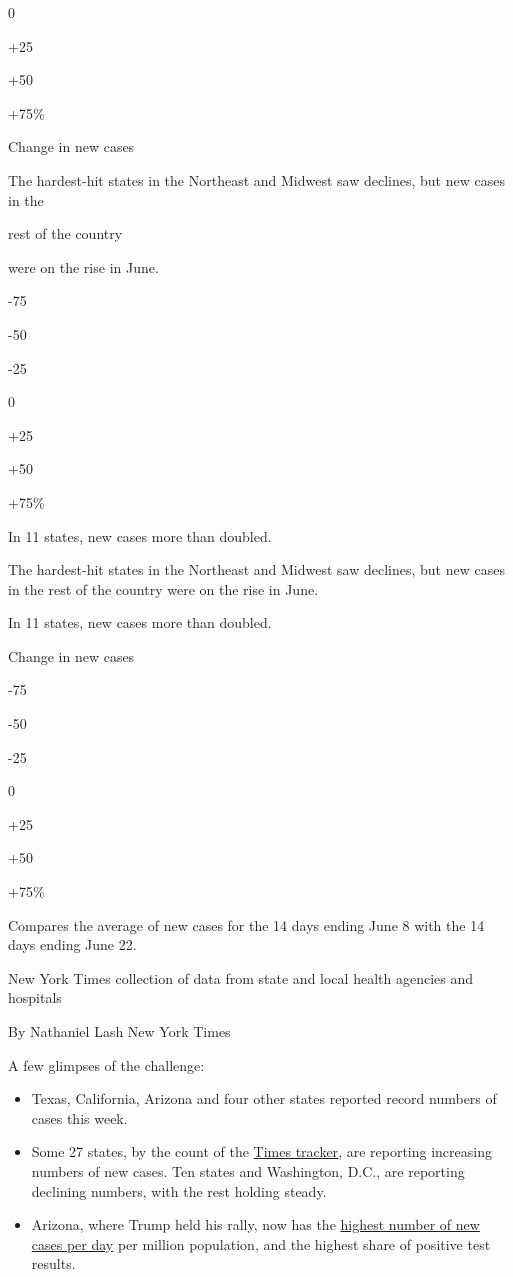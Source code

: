 0

+25

+50

+75\%

Change in new cases

The hardest-hit states in the Northeast and Midwest saw declines, but
new cases in the

rest of the country

were on the rise in June.

-75

-50

-25

0

+25

+50

+75\%

In 11 states, new cases more than doubled.

The hardest-hit states in the Northeast and Midwest saw declines, but
new cases in the rest of the country were on the rise in June.

In 11 states, new cases more than doubled.

Change in new cases

-75

-50

-25

0

+25

+50

+75\%

Compares the average of new cases for the 14 days ending June 8 with the
14 days ending June 22.

New York Times collection of data from state and local health agencies
and hospitals

By Nathaniel Lash \textbar{} New York Times

A few glimpses of the challenge:

\begin{itemize}
\item
  Texas, California, Arizona and four other states reported record
  numbers of cases this week.
\item
  Some 27 states, by the count of the
  \href{https://www.nytimes3xbfgragh.onion/interactive/2020/us/coronavirus-us-cases.html}{Times
  tracker}, are reporting increasing numbers of new cases. Ten states
  and Washington, D.C., are reporting declining numbers, with the rest
  holding steady.
\item
  Arizona, where Trump held his rally, now has the
  \href{https://www.covidexitstrategy.org/}{highest number of new cases
  per day} per million population, and the highest share of positive
  test results.
\end{itemize}

